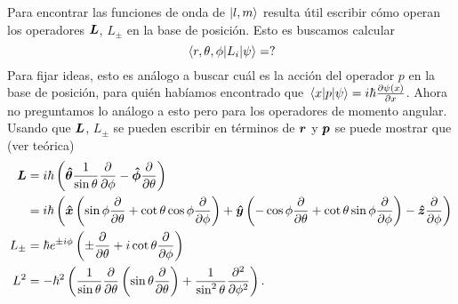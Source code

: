 \documentclass[10pt, a4paper]{article}
\numberwithin{equation}{subsection}
\begin{document}
Para encontrar las funciones de onda de $\ket{l,m}$ resulta útil escribir cómo
operan los operadores $\vb*{L}$, $L_\pm$ en la base de posición. Esto es
buscamos calcular
\begin{equation}
  \matrixel{r,\theta,\phi}{L_i}{\psi} = ?
\end{equation}
Para fijar ideas, esto es análogo a buscar cuál es la acción del operador $p$
en la base de posición, para quién habíamos encontrado que
$\matrixel{x}{p}{\psi} = i\hbar\pdv{\psi(x)}{x}$. Ahora no preguntamos lo
análogo a esto pero para los operadores de momento angular. Usando que
$\vb*{L}$, $L_\pm$ se pueden escribir en términos de $\vb*{r}$ y $\vb*{p}$
se puede mostrar que (ver teórica)
\begin{align}
  \vb*{L} &= i\hbar\left(\vu*{\theta}\frac{1}{\sin\theta}\pdv{\phi} -
    \vu*{\phi}\pdv{\theta}\right) \\
  &= i\hbar\left(\vu*{x}\left(\sin\phi\pdv{\theta} +
    \cot\theta\cos\phi\pdv{\phi}\right) + \vu*{y}\left(-\cos\phi\pdv{\theta} +
    \cot\theta\sin\phi\pdv{\phi}\right) - \vu*{z}\pdv{\phi}\right)
    \label{eq:def:Lspherical} \\
  L_\pm &= \hbar e^{\pm i\phi}\left(\pm\pdv{\theta} +
    i\cot\theta\pdv{\phi}\right) \label{eq:def:Lpmspherical} \\
  L^2 &= -\hbar^2\left(
    \frac{1}{\sin\theta}\pdv{\theta}\left(\sin\theta\pdv{\theta}\right) +
    \frac{1}{\sin^2\theta}\pdv[2]{\phi}\right). \label{eq:def:L2spherical}
\end{align}

\bigbreak
{}
\bigbreak
\end{document}
